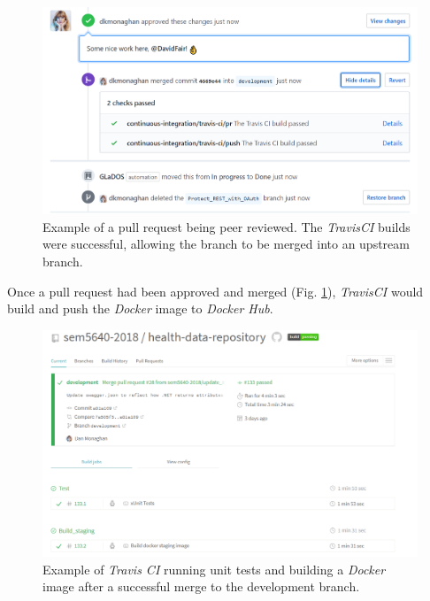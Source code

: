\begin{figure}[H]
    \centering
    \includegraphics[width=\textwidth]{Images/approve_pr.png}
    \caption{Example of a pull request being peer reviewed. The \textit{TravisCI} builds were successful, allowing the branch to be merged into an upstream branch.}
    \label{fig:approve_pull_request}
\end{figure}

Once a pull request had been approved and merged (Fig. \ref{fig:approve_pull_request}), \textit{TravisCI} would build and push the \textit{Docker} image to \textit{Docker Hub}.

\begin{figure}[H]
    \centering
    \includegraphics[width=\textwidth]{Images/travis_builds_overview.png}
    \caption{Example of \textit{Travis CI} running unit tests and building a \textit{Docker} image after a successful merge to the development branch.}
    \label{fig:travis_ui}
\end{figure}

